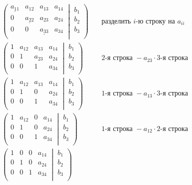 \begin{align*}
\left(\left.
\begin{matrix}
\underline{a_{11}}& a_{12}&a_{13}& a_{14}\\
0& \underline{a_{22}}&a_{23}& a_{24}\\
0& 0&\underline{a_{33}}& a_{34}\\
\end{matrix}
\:\right|\:
\begin{matrix}
b_1\\
b_2\\
b_3\\
\end{matrix}
\right)&
\quad \text{разделить }i\text{-ю строку на }a_{ii}\\
\left(\left.
\begin{matrix}
1& a_{12}&a_{13}& a_{14}\\
0& 1&a_{23}& a_{24}\\
0& 0&1& a_{34}\\
\end{matrix}
\:\right|\:
\begin{matrix}
b_1\\
b_2\\
b_3\\
\end{matrix}
\right)&
\quad 2\text{-я строка }-a_{23}\cdot3\text{-я строка}\\
\left(\left.
\begin{matrix}
1& a_{12}&a_{13}& a_{14}\\
0& 1&0& a_{24}\\
0& 0&1& a_{34}\\
\end{matrix}
\:\right|\:
\begin{matrix}
b_1\\
b_2\\
b_3\\
\end{matrix}
\right)&
\quad 1\text{-я строка }-a_{13}\cdot3\text{-я строка}\\
\left(\left.
\begin{matrix}
1& a_{12}&0& a_{14}\\
0& 1&0& a_{24}\\
0& 0&1& a_{34}\\
\end{matrix}
\:\right|\:
\begin{matrix}
b_1\\
b_2\\
b_3\\
\end{matrix}
\right)&
\quad 1\text{-я строка }-a_{12}\cdot2\text{-я строка}\\
\left(\left.
\begin{matrix}
1& 0&0& a_{14}\\
0& 1&0& a_{24}\\
0& 0&1& a_{34}\\
\end{matrix}
\:\right|\:
\begin{matrix}
b_1\\
b_2\\
b_3\\
\end{matrix}
\right)&
\end{align*}
